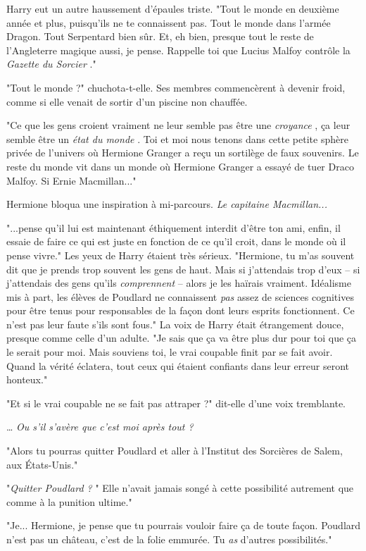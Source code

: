 Harry eut un autre haussement d'épaules triste. "Tout le monde en deuxième année et plus, puisqu'ils ne te connaissent pas. Tout le monde dans l'armée Dragon. Tout Serpentard bien sûr. Et, eh bien, presque tout le reste de l'Angleterre magique aussi, je pense. Rappelle toi que Lucius Malfoy contrôle la \emph{Gazette du Sorcier} ."

"Tout le monde ?" chuchota-t-elle. Ses membres commencèrent à devenir froid, comme si elle venait de sortir d'un piscine non chauffée.

"Ce que les gens croient vraiment ne leur semble pas être une \emph{croyance} , ça leur semble être un \emph{état du monde} . Toi et moi nous tenons dans cette petite sphère privée de l'univers où Hermione Granger a reçu un sortilège de faux souvenirs. Le reste du monde vit dans un monde où Hermione Granger a essayé de tuer Draco Malfoy. Si Ernie Macmillan..."

Hermione bloqua une inspiration à mi-parcours. \emph{Le capitaine Macmillan...} 

"...pense qu'il lui est maintenant éthiquement interdit d'être ton ami, enfin, il essaie de faire ce qui est juste en fonction de ce qu'il croit, dans le monde où il pense vivre." Les yeux de Harry étaient très sérieux. "Hermione, tu m'as souvent dit que je prends trop souvent les gens de haut. Mais si j'attendais trop d'eux – si j'attendais des gens qu'ils \emph{comprennent}  – alors je les haïrais vraiment. Idéalisme mis à part, les élèves de Poudlard ne connaissent \emph{pas } assez de sciences cognitives pour être tenus pour responsables de la façon dont leurs esprits fonctionnent. Ce n'est pas leur faute s'ils sont fous." La voix de Harry était étrangement douce, presque comme celle d'un adulte. "Je sais que ça va être plus dur pour toi que ça le serait pour moi. Mais souviens toi, le vrai coupable finit par se fait avoir. Quand la vérité éclatera, tout ceux qui étaient confiants dans leur erreur seront honteux."

"Et si le vrai coupable ne se fait pas attraper ?" dit-elle d'une voix tremblante.

… \emph{Ou s'il s'avère que c'est moi après tout ?} 

"Alors tu pourras quitter Poudlard et aller à l'Institut des Sorcières de Salem, aux États-Unis."

"\emph{Quitter Poudlard ?} " Elle n'avait jamais songé à cette possibilité autrement que comme à la punition ultime."

"Je... Hermione, je pense que tu pourrais vouloir faire ça de toute façon. Poudlard n'est pas un château, c'est de la folie emmurée. Tu \emph{as}  d'autres possibilités."

